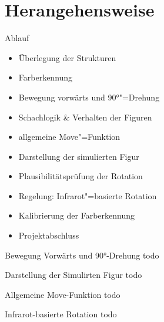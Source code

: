 
\section{Herangehensweise}


\begin{frame}{Ablauf}
    \begin{itemize}
        \item Überlegung der Strukturen
        \item Farberkennung
        \item Bewegung vorwärts und 90°"=Drehung
        \item Schachlogik \& Verhalten der Figuren
        \item allgemeine Move"=Funktion
        \item Darstellung der simulierten Figur
        \item Plausibilitätsprüfung der Rotation
        \item Regelung: Infrarot"=basierte Rotation
        \item Kalibrierung der Farberkennung
        \item Projektabschluss
    \end{itemize}
\end{frame}


\begin{frame}{Bewegung Vorwärts und 90°-Drehung}
    todo
\end{frame}


\begin{frame}{Darstellung der Simulirten Figur}
    todo
\end{frame}


\begin{frame}{Allgemeine Move-Funktion}
    todo
\end{frame}


\begin{frame}{Infrarot-basierte Rotation}
    todo
\end{frame}
